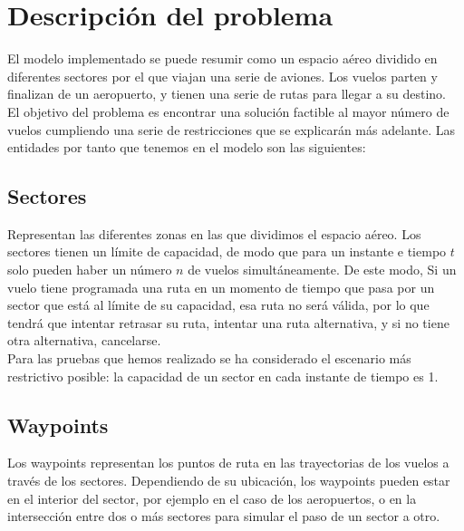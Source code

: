 \chapter{Descripción del problema}


El modelo implementado se puede resumir como un espacio aéreo dividido en diferentes sectores por el que viajan una serie de aviones. Los vuelos parten y finalizan de un aeropuerto, y tienen una serie de rutas para llegar a su destino.\\
El objetivo del problema es encontrar una solución factible al mayor número de vuelos cumpliendo una serie de restricciones que se explicarán más adelante. Las entidades por tanto que tenemos en el modelo son las siguientes:
\section{Sectores}
Representan las diferentes zonas en las que dividimos el espacio aéreo. Los sectores tienen un límite de capacidad, de modo que para un instante e tiempo $t$ solo pueden haber un número $n$ de vuelos simultáneamente. De este modo, Si un vuelo tiene programada una ruta en un momento de tiempo que pasa por un sector que está al límite de su capacidad, esa ruta no será válida, por lo que tendrá que intentar retrasar su ruta, intentar una ruta alternativa, y si no tiene otra alternativa, cancelarse.\\
Para las pruebas que hemos realizado se ha considerado el escenario más restrictivo posible: la capacidad de un sector en cada instante de tiempo es 1.

\section{Waypoints}
Los waypoints representan los puntos de ruta en las trayectorias de los vuelos a través de los sectores. Dependiendo de su ubicación, los waypoints pueden estar en el interior del sector, por ejemplo en el caso de los aeropuertos, o en la intersección entre dos o más sectores para simular el paso de un sector a otro.


